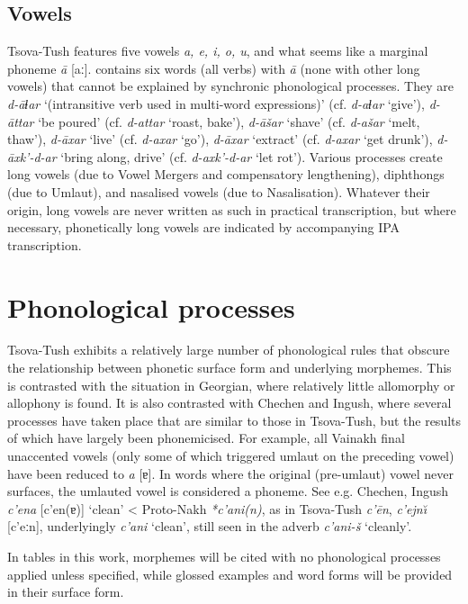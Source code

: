 \subsection{Vowels}
Tsova-Tush features five vowels \textit{a, e, i, o, u}, and what seems like a marginal phoneme \textit{\={a}} [aː]. \textcite{kadkad84} contains six words (all verbs) with \textit{\={a}} (none with other long vowels) that cannot be explained by synchronic phonological processes. They are \textit{d-āɬar} `(intransitive verb used in multi-word expressions)' (cf. \textit{d-aɬar} `give'), \textit{d-āttar} `be poured' (cf. \textit{d-attar} `roast, bake'), \textit{d-āšar} `shave' (cf. \textit{d-ašar} `melt, thaw'), \textit{d-āxar} `live' (cf. \textit{d-axar} `go'), \textit{d-āxar} `extract' (cf. \textit{d-axar} `get drunk'), \textit{d-āxk'-d-ar} `bring along, drive' (cf. \textit{d-axk'-d-ar} `let rot'). Various processes create long vowels (due to Vowel Mergers and compensatory lengthening), diphthongs (due to Umlaut), and nasalised vowels (due to Nasalisation). Whatever their origin, long vowels are never written as such in practical transcription, but where necessary, phonetically long vowels are indicated by accompanying IPA transcription.



\section{Phonological processes} \label{processes}
Tsova-Tush exhibits a relatively large number of phonological rules that obscure the relationship between phonetic surface form and underlying morphemes. This is contrasted with the situation in Georgian, where relatively little allomorphy or allophony is found. It is also contrasted with Chechen and Ingush, where several processes have taken place that are similar to those in Tsova-Tush, but the results of which have largely been phonemicised. For example, all Vainakh final unaccented vowels (only some of which triggered umlaut on the preceding vowel) have been reduced to \textit{a} [ɐ]. In words where the original (pre-umlaut) vowel never surfaces, the umlauted vowel is considered a phoneme. See e.g. Chechen, Ingush \textit{c'ena} [c'en(ɐ)] `clean' < Proto-Nakh \textit{*c'ani(n)}, as in Tsova-Tush \textit{c'\={e}n}, \textit{c'ejn\u{\i}} [c'eːn], underlyingly \textit{c'ani} `clean', still seen in the adverb \textit{c'ani-š} `cleanly'.


In tables in this work, morphemes will be cited with no phonological processes applied unless specified, while glossed examples and word forms will be provided in their surface form. 

